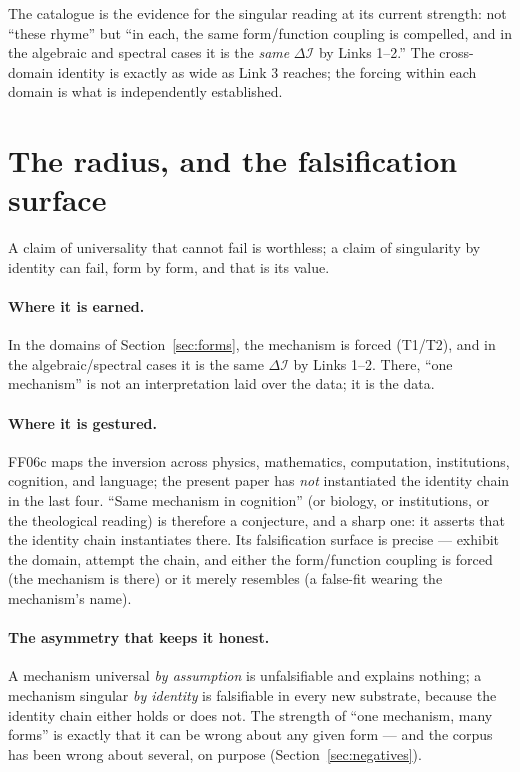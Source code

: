 \documentclass[11pt,a4paper]{article}
\newcommand{\dI}{\Delta\mathcal{I}}
\newcommand{\TT}{\textsf{T1}}
\newcommand{\Tw}{\textsf{T2}}
\newcommand{\paper}[1]{\textsf{#1}}
\theoremstyle{definition}
\theoremstyle{plain}
\begin{document}
\noindent The catalogue is the evidence for the singular reading at its current strength: not ``these
rhyme'' but ``in each, the same form/function coupling is compelled, and in the algebraic and
spectral cases it is the \emph{same} $\dI$ by Links 1--2.'' The cross-domain identity is exactly as
wide as Link 3 reaches; the forcing within each domain is what is independently established.

\section{The radius, and the falsification surface}\label{sec:radius}

A claim of universality that cannot fail is worthless; a claim of singularity by identity can fail,
form by form, and that is its value.

\paragraph{Where it is earned.} In the domains of Section~\ref{sec:forms}, the mechanism is forced
(\TT/\Tw), and in the algebraic/spectral cases it is the same $\dI$ by Links 1--2. There, ``one
mechanism'' is not an interpretation laid over the data; it is the data.

\paragraph{Where it is gestured.} \paper{FF06c} maps the inversion across physics, mathematics,
computation, institutions, cognition, and language; the present paper has \emph{not} instantiated the
identity chain in the last four. ``Same mechanism in cognition'' (or biology, or institutions, or the
theological reading) is therefore a conjecture, and a sharp one: it asserts that the identity chain
instantiates there. Its falsification surface is precise --- exhibit the domain, attempt the chain,
and either the form/function coupling is forced (the mechanism is there) or it merely resembles (a
false-fit wearing the mechanism's name).

\paragraph{The asymmetry that keeps it honest.} A mechanism universal \emph{by assumption} is
unfalsifiable and explains nothing; a mechanism singular \emph{by identity} is falsifiable in every
new substrate, because the identity chain either holds or does not. The strength of ``one mechanism,
many forms'' is exactly that it can be wrong about any given form --- and the corpus has been wrong
about several, on purpose (Section~\ref{sec:negatives}).
\end{document}
